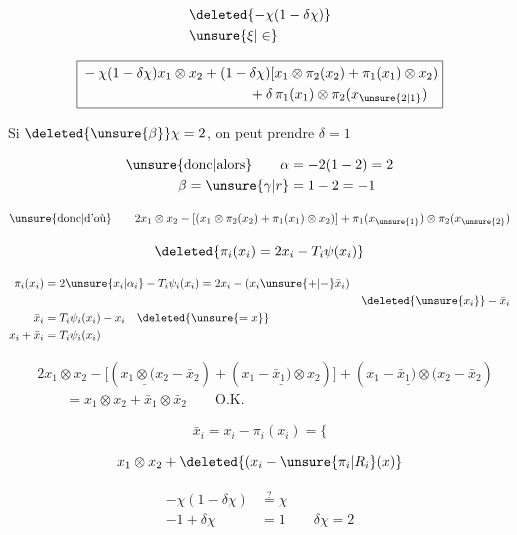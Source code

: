 \[
\begin{aligned}
&\deleted{-\chi(1-\delta\chi)}\\
&\unsure{\xi|\in}
\end{aligned}
\]

\[
\boxed{\begin{aligned}
&-\chi(1-\delta\chi)x_1\otimes x_2+(1-\delta\chi)[x_1\otimes\pi_2(x_2)+\pi_1(x_1)\otimes x_2)\\
&\hspace{12em}+\delta\,\pi_1(x_1)\otimes\pi_2(x_{\unsure{2|1}})
\end{aligned}}
\]

Si $\deleted{\unsure{\beta}}\chi=2$, on peut prendre $\delta=1$

\[
\begin{aligned}
\text{\unsure{donc|alors}}\qquad\alpha&=-2(1-2)=2\\
\beta=\unsure{\gamma|r}&=1-2=-1
\end{aligned}
\]

\[
\text{\unsure{donc|d'où}}\qquad
2x_1\otimes x_2-[(x_1\otimes\pi_2(x_2)+\pi_1(x_1)\otimes x_2)]
+\pi_1(x_{\unsure{1}})\otimes\pi_2(x_{\unsure{2}})
\]

\[\deleted{\pi_i(x_i)=2x_i-T_i\psi(x_i)}\]

\[
\begin{aligned}
\pi_i(x_i)&=2\unsure{x_i|\alpha_i}-T_i\psi_i(x_i)=2x_i-(x_i\unsure{+|-}\bar x_i)\\
&&{}\deleted{\unsure{x_i}}-\bar x_i\\
\bar x_i&=T_i\psi_i(x_i)-x_i\quad\deleted{\unsure{=x}}\\
x_i+\bar x_i&=T_i\psi_i(x_i)
\end{aligned}
\]

\[
\begin{aligned}
&2x_1\otimes x_2-\big[(\underline{x_1\otimes(x_2}-\bar x_2)+(\underline{x_1-\bar x_1)\otimes x_2})\big]
+(\underline{x_1-\bar x_1)\otimes(x_2}-\bar x_2)\\
&\qquad=x_1\otimes x_2+\bar x_1\otimes\bar x_2\qquad\text{O.K.}
\end{aligned}
\]

\[\bar x_i=x_i-\pi_i(x_i)=\big\{\]

\[x_1\otimes x_2+\deleted{(x_i-\unsure{\pi_i|R_i}(x)}\]

\[
\begin{aligned}
-\chi(1-\delta\chi)&\overset{?}{=}\chi\\
-1+\delta\chi&=1\qquad\boxed{\delta\chi=2}
\end{aligned}
\]
